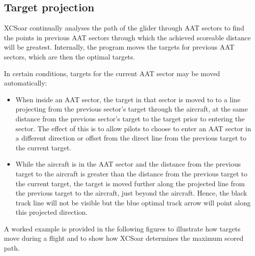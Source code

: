 \documentclass[a4paper,12pt]{refrep}
\begin{document}
\subsection*{Target projection}

XCSoar continually analyses the path of the glider through AAT sectors
to find the points in previous AAT sectors through which the achieved
scoreable distance will be greatest.  Internally, the program moves
the targets for previous AAT sectors, which are then the optimal
targets.

In certain conditions, targets for the current AAT sector may be moved
automatically:
\begin{itemize}
\item When inside an AAT sector, the target in that sector is moved to
to a line projecting from the previous sector's target through the
aircraft, at the same distance from the previous sector's target to
the target prior to entering the sector.  The effect of this is to
allow pilots to choose to enter an AAT sector in a different direction
or offset from the direct line from the previous target to the current
target.

\item While the aircraft is in the AAT sector and the distance from the
previous target to the aircraft is greater than the distance from the
previous target to the current target, the target is moved further
along the projected line from the previous target to the aircraft,
just beyond the aircraft.  Hence, the black track line will not be
visible but the blue optimal track arrow will point along this
projected direction.
\end{itemize}

A worked example is provided in the following figures to illustrate
how targets move during a flight and to show how XCSoar determines the
maximum scored path.
\end{document}
